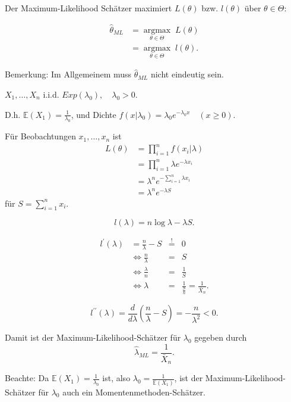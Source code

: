 \documentclass{tstextbook}
\DeclareMathOperator{\argmax}{argmax}
\newcommand{\E}{\mathbb E}
\begin{document}
Der Maximum-Likelihood Schätzer maximiert $ L(\theta) $ bzw. $ l(\theta) $ über $ \theta\in\Theta $: 

\[
\begin{aligned}
	\hat{\theta}_{ML} & = \underset{\theta\in\Theta}{\argmax}\; L(\theta) \\
	& = \underset{\theta\in\Theta}{\argmax}\; l(\theta) .
\end{aligned}
\]

\begin{remark}
	Bemerkung: Im Allgemeinem muss $ \hat{\theta}_{ML} $ nicht eindeutig sein.
\end{remark} 

\begin{example}[Exponentialverteilung]
	$ X_1,\ldots,X_n $ i.i.d. $ Exp(\lambda_0), \quad \lambda_0 >0 $. 
	
	D.h. $ \E(X_1)=\frac{1}{\lambda_0} $, und Dichte $ f(x|\lambda_0) = \lambda_0 e^{-\lambda_0 x} \quad (x\ge0) $.
	
	Für Beobachtungen $ x_1,\ldots,x_n $ ist 
	\[
	\begin{aligned}
		L(\theta) & = \prod_{i=1}^{n} f(x_i|\lambda) \\
		& = \prod_{i=1}^{n} \lambda e^{-\lambda x_i} \\
		& = \lambda^n e^{-\sum_{i=1}^{n}\lambda x_i} \\
		& = \lambda^n e^{-\lambda S}
	\end{aligned}
	\]
	für $ S = \sum_{i=1}^{n} x_i $.
	
	\[
	l(\lambda) = n \log \lambda - \lambda S.
	\]
	
	\[
	\begin{aligned}
		l^\prime (\lambda) & = \frac{n}{\lambda} - S &  \overset{!}{=} & 0 \\
		& \Leftrightarrow \frac{n}{\lambda} & = & S \\
		& \Leftrightarrow \frac{\lambda}{n} & = & \frac{1}{S} \\
		& \Leftrightarrow \lambda & = & \frac{1}{\frac{S}{n}} = \frac{1}{\bar{X}_n}.
	\end{aligned}
	\]
	
	\[
	l^{\prime\prime} (\lambda) = \frac{d}{d\lambda} \left(\frac{n}{\lambda} - S \right) = - \frac{n}{\lambda^2} < 0.
	\]
	
	Damit ist der Maximum-Likelihood-Schätzer für $ \lambda_0 $ gegeben durch 
	\[
	\hat{\lambda}_{ML} = \frac{1}{\bar{X}_n}.
	\]
\end{example}

\begin{remark}
	Beachte: Da $ \E(X_1)=\frac{1}{\lambda_0} $ ist, also $ \lambda_0 = \frac{1}{\E(X_1)} $, ist der Maximum-Likelihood-Schätzer für $ \lambda_0 $ auch ein Momentenmethoden-Schätzer.
\end{remark}
\end{document}
